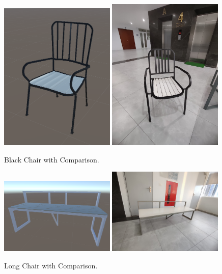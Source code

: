 \documentclass[12pt]{article}
\begin{document}
\begin{figure}[H]
    \centering
    \includegraphics[width=0.49\textwidth]{o2.png}
    \includegraphics[width=0.49\textwidth]{4chan.jpg}
    \caption{Black Chair with Comparison.}
\end{figure}

\begin{figure}[H]
    \centering
    \includegraphics[width=0.49\textwidth]{o3.png}
    \includegraphics[width=0.49\textwidth]{ghe.jpg}
    \caption{Long Chair with Comparison.}
\end{figure}
\end{document}
